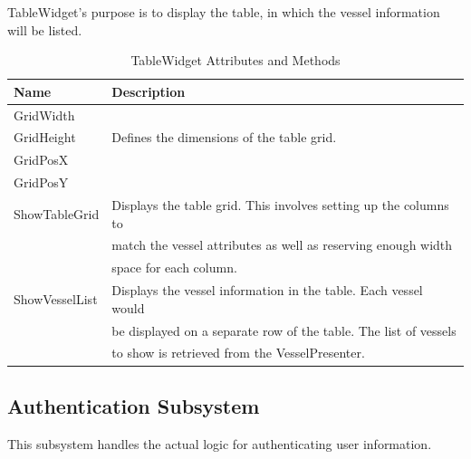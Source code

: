 \documentclass[12pt]{article}
\begin{document}
\vspace*{0.2in}
\vspace*{0.15in}
TableWidget’s purpose is to display the table, in which the vessel information will be listed.
\begin{table}[ht]
\centering
   \begin{tabular}{|l|l|}
        \hline
        {\large Name} & {\large Description} \\
        \hline\hline
        GridWidth &  \\
        GridHeight & Defines the dimensions of the table grid.\\
        GridPosX &  \\
        GridPosY &  \\
        \hline
        ShowTableGrid & Displays the table grid. This involves setting up the columns to\\
         & match the vessel attributes as well as reserving enough width\\
         & space for each column.\\
        \hline
        ShowVesselList & Displays the vessel information in the table. Each vessel would\\
         & be displayed on a separate row of the table. The list of vessels\\
         & to show is retrieved from the VesselPresenter.\\
        \hline
    \end{tabular}
\caption{TableWidget Attributes and Methods}
\end{table}
\clearpage


\subsection{Authentication Subsystem}
This subsystem handles the actual logic for authenticating user information.
\end{document}
